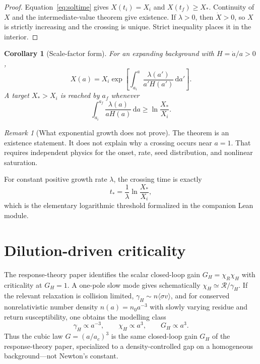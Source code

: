\documentclass[11pt]{article}
\newtheorem{corollary}[theorem]{Corollary}
\theoremstyle{definition}
\theoremstyle{remark}
\newtheorem{remark}[theorem]{Remark}
\newcommand{\dd}{\mathrm{d}}
\begin{document}
\begin{proof}
Equation~\eqref{eq:soltime} gives $X(t_i)=X_i$ and $X(t_f)\ge X_*$.
Continuity of $X$ and the intermediate-value theorem give existence.
If $\lambda>0$, then $\dot X>0$, so $X$ is strictly increasing and the crossing is unique.
Strict inequality places it in the interior.
\end{proof}

\begin{corollary}[Scale-factor form]
\label{cor:scale-factor}
For an expanding background with $H=\dot a/a>0$,
\begin{equation}
\label{eq:sola}
X(a)=X_i\exp\!\left[\int_{a_i}^{a}\frac{\lambda(a')}{a'H(a')}\,\dd a'\right].
\end{equation}
A target $X_*>X_i$ is reached by $a_f$ whenever
\begin{equation}
\label{eq:mastercross}
\boxed{\int_{a_i}^{a_f}\frac{\lambda(a)}{aH(a)}\,\dd a\ge\ln\frac{X_*}{X_i}.}
\end{equation}
\end{corollary}

\begin{remark}[What exponential growth does not prove]
\label{rem:crossing-limits}
The theorem is an existence statement.
It does not explain why a crossing occurs near $a=1$.
That requires independent physics for the onset, rate, seed distribution, and nonlinear saturation.
\end{remark}

For constant positive growth rate $\lambda$, the crossing time is exactly
\begin{equation}
t_*=\frac1\lambda\ln\frac{X_*}{X_i},
\end{equation}
which is the elementary logarithmic threshold formalized in the companion Lean module.

\section{Dilution-driven criticality}
\label{sec:dilution}
The response-theory paper identifies the scalar closed-loop gain $G_H=\chi_R\chi_H$ with criticality at $G_H=1$.
A one-pole slow mode gives schematically $\chi_H\simeq\mathcal R/\gamma_H$.
If the relevant relaxation is collision limited, $\gamma_H\sim n\langle\sigma v\rangle$, and for conserved nonrelativistic number density $n(a)=n_0 a^{-3}$ with slowly varying residue and return susceptibility, one obtains the modelling class
\begin{equation}
\gamma_H\propto a^{-3},\qquad \chi_H\propto a^3,\qquad G_H\propto a^3.
\end{equation}
Thus the cubic law $G=(a/a_c)^3$ is the same closed-loop gain $G_H$ of the response-theory paper, specialized to a density-controlled gap on a homogeneous background---not Newton's constant.
\end{document}
